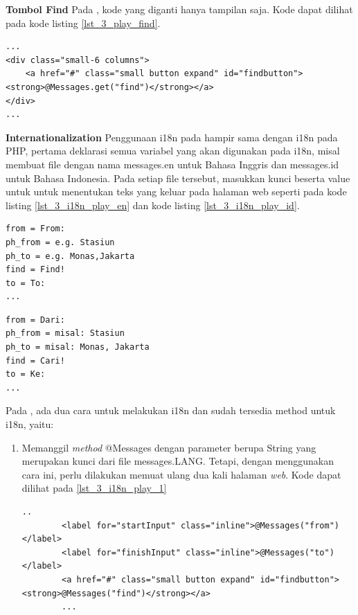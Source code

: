 \documentclass[a4paper,twoside]{article}
\begin{document}
\begin{enumerate}
\begin{enumerate}
\end{enumerate}

\textbf{Tombol Find}
Pada \play, kode yang diganti hanya tampilan saja. Kode dapat dilihat pada kode listing \ref{lst_3_play_find}.
\begin{lstlisting}[caption=Fungsi JavaScript untuk ketika tombol \textit{find} ditekan,label = {lst_3_play_find}]
...
<div class="small-6 columns">
    <a href="#" class="small button expand" id="findbutton"><strong>@Messages.get("find")</strong></a>
</div>
...
\end{lstlisting}

\textbf{Internationalization}
Penggunaan i18n pada \play hampir sama dengan i18n pada PHP, pertama deklarasi semua variabel yang akan digunakan pada i18n, misal membuat file dengan nama messages.en untuk Bahasa Inggris dan messages.id untuk Bahasa Indonesia. Pada setiap file tersebut, masukkan kunci beserta value untuk untuk menentukan teks yang keluar pada halaman web seperti pada kode listing \ref{lst_3_i18n_play_en} dan kode listing \ref{lst_3_i18n_play_id}.
\begin{lstlisting}[caption=Script \play untuk Bahasa Inggris,label = {lst_3_i18n_play_en}]
from = From:
ph_from = e.g. Stasiun
ph_to = e.g. Monas,Jakarta
find = Find!
to = To:
...
\end{lstlisting}
\begin{lstlisting}[caption=Script \play untuk Bahasa Indonesia,label = {lst_3_i18n_play_id}]
from = Dari:
ph_from = misal: Stasiun
ph_to = misal: Monas, Jakarta
find = Cari!
to = Ke:
...
\end{lstlisting}
Pada \play, ada dua cara untuk melakukan i18n dan sudah tersedia method untuk i18n, yaitu:

\begin{enumerate}
	\item Memanggil \textit{method} @Messages dengan parameter berupa String yang merupakan kunci dari file messages.LANG. Tetapi, dengan menggunakan cara ini, perlu dilakukan memuat ulang dua kali halaman \textit{web}. Kode dapat dilihat pada \ref{lst_3_i18n_play_1}
	
	\begin{lstlisting}[caption=Script \play untuk Internationalization,label = {lst_3_i18n_play_1}]
		..
		<label for="startInput" class="inline">@Messages("from")</label>
		<label for="finishInput" class="inline">@Messages("to")</label>
		<a href="#" class="small button expand" id="findbutton"><strong>@Messages("find")</strong></a>
		...
	\end{lstlisting}
	

\end{enumerate}
\end{enumerate}
\end{document}
